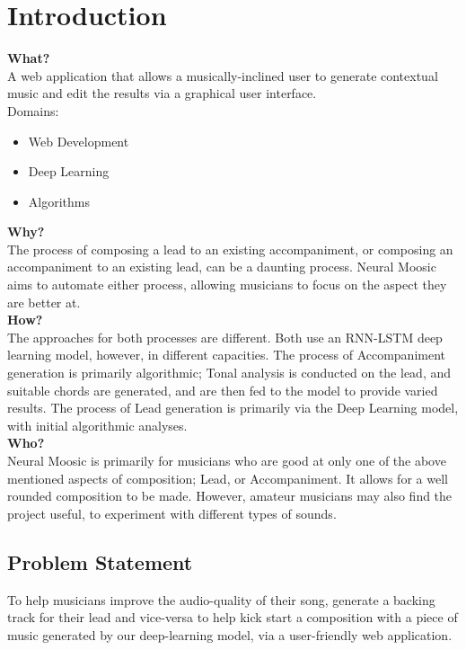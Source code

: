 \documentclass[12pt]{report}
\begin{document}
\chapter{Introduction}
\textbf{What?}\\
A web application that allows a musically-inclined user to generate contextual music and edit the results via a graphical user interface.\\
Domains:
\begin{itemize}
  \item Web Development
  \item Deep Learning
  \item Algorithms
\end{itemize}
\textbf{Why?}\\
The process of composing a lead to an existing accompaniment, or composing an accompaniment to an existing lead, can be a daunting process. Neural Moosic aims to automate either process, allowing musicians to focus on the aspect they are better at.\\ 
\textbf{How?}\\
The approaches for both processes are different. Both use an RNN-LSTM deep learning model, however, in different capacities. The process of Accompaniment generation is primarily algorithmic; Tonal analysis is conducted on the lead, and suitable chords are generated, and are then fed to the model to provide varied results. The process of Lead generation is primarily via the Deep Learning model, with initial algorithmic analyses.\\
\textbf{Who?}\\
Neural Moosic is primarily for musicians who are good at only one of the above mentioned aspects of composition; Lead, or Accompaniment. It allows for a well rounded composition to be made. However, amateur musicians may also find the project useful, to experiment with different types of sounds.

\section{Problem Statement}
To help musicians improve the audio-quality of their song, generate a backing track for their lead and vice-versa to help kick start a composition with a piece of music generated by our deep-learning model, via a user-friendly web application.
\end{document}
